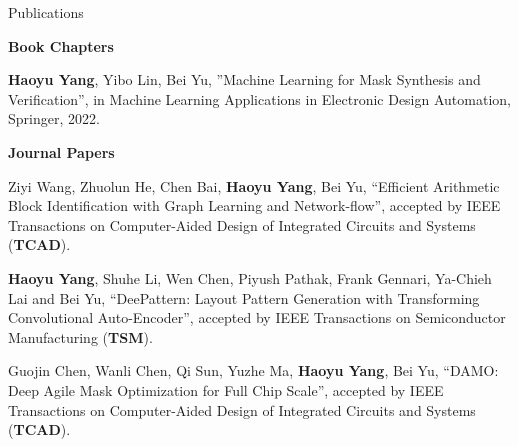\clearpage
\begin{rSection}{Publications}
	
\iftrue



\textbf{Book Chapters}
\begin{description}[font=\normalfont]
	
	\item[{[B1]}]{
		\textbf{Haoyu Yang}, Yibo Lin, Bei Yu,
		''Machine Learning for Mask Synthesis and Verification'', 
		in Machine Learning Applications in Electronic Design Automation,
		Springer, 2022.
	}
	
\end{description}


\textbf{Journal Papers}
\begin{description}[font=\normalfont]
	
\item[{[J16]}]{
	Ziyi Wang, Zhuolun He, Chen Bai, \textbf{Haoyu Yang}, Bei Yu,
	``Efficient Arithmetic Block Identification with Graph Learning and Network-flow'', 
	accepted by IEEE Transactions on Computer-Aided Design of Integrated Circuits and Systems (\textbf{TCAD}).
}	


\item[{[J15]}]{
	\textbf{Haoyu Yang}, Shuhe Li, Wen Chen, Piyush Pathak, Frank Gennari, Ya-Chieh Lai and Bei Yu, ``DeePattern: Layout Pattern Generation with Transforming Convolutional Auto-Encoder'',
	accepted by IEEE Transactions on Semiconductor Manufacturing (\textbf{TSM}).
}

\item[{[J14]}]{
	Guojin Chen, Wanli Chen, Qi Sun, Yuzhe Ma, \textbf{Haoyu Yang}, Bei Yu,
	``DAMO: Deep Agile Mask Optimization for Full Chip Scale'', 
	accepted by IEEE Transactions on Computer-Aided Design of Integrated Circuits and Systems (\textbf{TCAD}).
}


\end{description}
\end{rSection}
